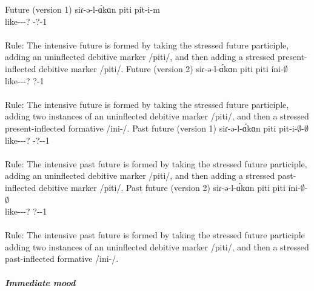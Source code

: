 \begin{exe}
\begin{xlist}
		\ex Future (version 1) \gll 
		siɾ-ə-l-\'ɑkɑn piti p\'it-i-m \\ 
		like-{\thgloss}-{\infgloss}-{\futcvb}? {\deb} {\deb}-?-1{\sg}\\ 
		\trans {} \\
		Rule: The intensive future is formed by taking the stressed future participle, adding an uninflected debitive marker /piti/, and then adding a stressed present-inflected debitive marker /piti/. 
		\ex Future (version 2) \gll 
		siɾ-ə-l-\'ɑkɑn piti piti \'ini-$\emptyset$ \\ 
		like-{\thgloss}-{\infgloss}-{\futcvb}? {\deb} {\deb} {?}-1{\sg}\\ 
		\trans {} \\
		Rule: The intensive future is formed by taking the stressed future participle, adding two instances of an uninflected debitive marker /piti/, and then a stressed present-inflected formative /ini-/. 
		\ex Past future (version 1) \gll 
		siɾ-ə-l-\'ɑkɑn piti pit-i-$\emptyset$-$\emptyset$ \\ 
		like-{\thgloss}-{\infgloss}-{\futcvb}? {\deb} {\deb}-?-{\pst}-1{\sg} \\ 
		\trans {} \\
		Rule: The intensive past future is formed by taking the stressed future participle, adding an uninflected debitive marker /piti/, and then adding a stressed past-inflected debitive marker /piti/. 
		\ex Past future (version 2) \gll 
		siɾ-ə-l-\'ɑkɑn piti piti \'ini-$\emptyset$-$\emptyset$ \\ 
		like-{\thgloss}-{\infgloss}-{\futcvb}? {\deb} {\deb} {?}-{\pst}-1{\sg} \\ 
		\trans {} \\
		Rule: The intensive past future is formed by taking the stressed future participle adding two instances of an uninflected debitive marker /piti/, and then a stressed past-inflected formative /ini-/. 
		
		
	\end{xlist}
	
	
\end{exe}


\subparagraph{Immediate mood}



